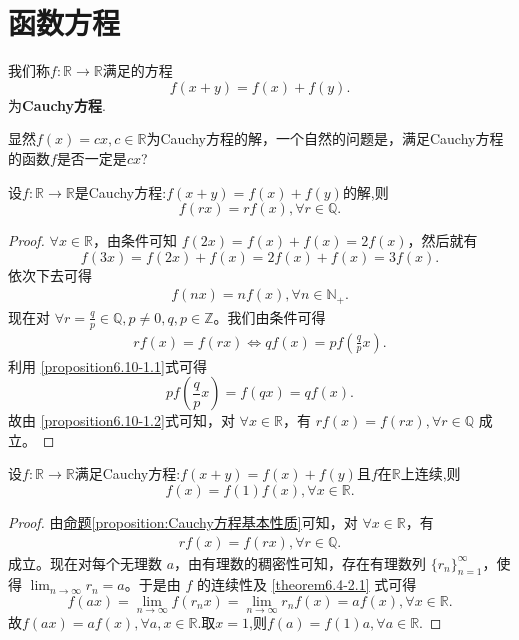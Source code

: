 \documentclass[lang=cn,newtx,10pt,scheme=chinese]{elegantbook}
\begin{document}
\section{函数方程}

\begin{definition}
我们称\(f:\mathbb{R}\to\mathbb{R}\)满足的方程
\[
f(x + y)=f(x)+f(y).
\]
为\textbf{Cauchy方程}.
\end{definition}
\begin{note}
显然\(f(x)=cx,c\in\mathbb{R}\)为Cauchy方程的解，一个自然的问题是，满足Cauchy方程的函数\(f\)是否一定是\(cx\)?
\end{note}

\begin{proposition}[Cauchy方程基本性质]\label{proposition:Cauchy方程基本性质}
设\(f:\mathbb{R}\to\mathbb{R}\)是Cauchy方程:$f(x + y)=f(x)+f(y)$的解,则
\[
f(rx)=rf(x),\forall r\in\mathbb{Q}.
\]
\end{proposition}
\begin{proof}
\(\forall x\in \mathbb{R}\)，由条件可知 \(f(2x)=f(x)+f(x)=2f(x)\)，然后就有
\[
f(3x)=f(2x)+f(x)=2f(x)+f(x)=3f(x).
\]
依次下去可得
\begin{align}
f(nx)=nf(x),\forall n\in \mathbb{N}_+. \label{proposition6.10-1.1}
\end{align}
现在对 \(\forall r = \frac{q}{p}\in \mathbb{Q},p\neq 0,q,p\in \mathbb{Z}\)。我们由条件可得
\begin{align}
rf(x)=f(rx)\Leftrightarrow qf(x)=pf\left(\frac{q}{p}x\right). \label{proposition6.10-1.2} 
\end{align}
利用 \eqref{proposition6.10-1.1}式可得
\[
pf\left(\frac{q}{p}x\right)=f(qx)=qf(x).
\]
故由 \eqref{proposition6.10-1.2}式可知，对 \(\forall x\in \mathbb{R}\)，有 \(rf(x)=f(rx),\forall r\in \mathbb{Q}\) 成立。
\end{proof}

\begin{theorem}\label{theorem:Cauchy方程加上连续性就能得到解是线性函数}
设\(f:\mathbb{R}\to\mathbb{R}\)满足Cauchy方程:$f(x + y)=f(x)+f(y)$且$f$在$\mathbb{R}$上连续,则
\[
f(x)=f(1)f(x),\forall x\in\mathbb{R}.
\]
\end{theorem}
\begin{proof}
由\hyperref[proposition:Cauchy方程基本性质]{命题\ref{proposition:Cauchy方程基本性质}}可知，对 \(\forall x\in \mathbb{R}\)，有
\begin{align}
rf(x)=f(rx),\forall r\in \mathbb{Q}. \label{theorem6.4-2.1}  
\end{align}
成立。现在对每个无理数 \(a\)，由有理数的稠密性可知，存在有理数列 \(\{r_n\}_{n = 1}^{\infty}\)，使得 \(\lim_{n\rightarrow \infty}r_n=a\)。于是由 \(f\) 的连续性及 \eqref{theorem6.4-2.1} 式可得
\[
f(ax)=\lim_{n\rightarrow \infty}f(r_nx)=\lim_{n\rightarrow \infty}r_nf(x)=af(x),\forall x\in \mathbb{R}.
\]
故$f(ax)=af(x),\forall a,x\in\mathbb{R}$.取$x=1$,则$f(a)=f(1)a,\forall a\in\mathbb{R}.$
\end{proof}
\end{document}
